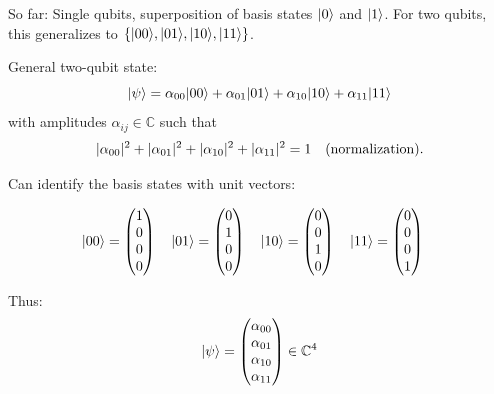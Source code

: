 So far: Single qubits, superposition of basis states $\lvert0\rangle$ and $\lvert1\rangle$.
For two qubits, this generalizes to $\{\lvert00\rangle, \lvert01\rangle, \lvert10\rangle, \lvert11\rangle\}$. \newline

General two-qubit state:
\begin{equation}
    \lvert\psi\rangle = \alpha_{00} \lvert00\rangle + \alpha_{01} \lvert01\rangle + \alpha_{10} \lvert10\rangle + \alpha_{11} \lvert11\rangle
\end{equation}
with amplitudes $\alpha_{ij} \in \mathbb{C}$ such that
\begin{equation}
    \lvert\alpha_{00}\rvert^2  + \lvert\alpha_{01}\rvert^2  + \lvert\alpha_{10}\rvert^2  + \lvert\alpha_{11}\rvert^2 = 1 
    \quad \text{(normalization).}
\end{equation}

Can identify the basis states with unit vectors:

\begin{equation}
    \ket{00} = \begin{pmatrix*}
        1 \\ 0 \\ 0 \\ 0
    \end{pmatrix*} \quad
    \ket{01} = \begin{pmatrix*}
        0 \\ 1 \\ 0 \\ 0
    \end{pmatrix*} \quad
    \ket{10} = \begin{pmatrix*}
        0 \\ 0 \\ 1 \\ 0
    \end{pmatrix*} \quad
    \ket{11} = \begin{pmatrix*}
        0 \\ 0 \\ 0 \\ 1
    \end{pmatrix*} \quad
\end{equation}

Thus: 
\begin{equation}
    \ket{\psi} = \begin{pmatrix*}
        \alpha_{00} \\ \alpha_{01} \\ \alpha_{10} \\ \alpha_{11} 
    \end{pmatrix*} \in \mathbb{C}^4
\end{equation}

